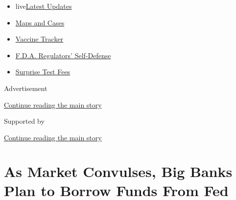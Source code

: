 \begin{itemize}
\tightlist
\item
  live\href{https://www.nytimes3xbfgragh.onion/2020/09/11/world/covid-19-coronavirus.html?name=styln-coronavirus-markets\&region=TOP_BANNER\&block=storyline_menu_recirc\&action=click\&pgtype=Article\&impression_id=3f6fb990-f4c6-11ea-8682-bfbfb46aa2bd\&variant=undefined}{Latest
  Updates}
\item
  \href{https://www.nytimes3xbfgragh.onion/interactive/2020/us/coronavirus-us-cases.html?name=styln-coronavirus-markets\&region=TOP_BANNER\&block=storyline_menu_recirc\&action=click\&pgtype=Article\&impression_id=3f6fb991-f4c6-11ea-8682-bfbfb46aa2bd\&variant=undefined}{Maps
  and Cases}
\item
  \href{https://www.nytimes3xbfgragh.onion/interactive/2020/science/coronavirus-vaccine-tracker.html?name=styln-coronavirus-markets\&region=TOP_BANNER\&block=storyline_menu_recirc\&action=click\&pgtype=Article\&impression_id=3f6fb992-f4c6-11ea-8682-bfbfb46aa2bd\&variant=undefined}{Vaccine
  Tracker}
\item
  \href{https://www.nytimes3xbfgragh.onion/2020/09/10/us/politics/fda-coronavirus-vaccine.html?name=styln-coronavirus-markets\&region=TOP_BANNER\&block=storyline_menu_recirc\&action=click\&pgtype=Article\&impression_id=3f6fb993-f4c6-11ea-8682-bfbfb46aa2bd\&variant=undefined}{F.D.A.
  Regulators' Self-Defense}
\item
  \href{https://www.nytimes3xbfgragh.onion/2020/09/09/upshot/coronavirus-surprise-test-fees.html?name=styln-coronavirus-markets\&region=TOP_BANNER\&block=storyline_menu_recirc\&action=click\&pgtype=Article\&impression_id=3f6fb994-f4c6-11ea-8682-bfbfb46aa2bd\&variant=undefined}{Surprise
  Test Fees}
\end{itemize}

Advertisement

\protect\hyperlink{after-top}{Continue reading the main story}

Supported by

\protect\hyperlink{after-sponsor}{Continue reading the main story}

\hypertarget{as-market-convulses-big-banks-plan-to-borrow-funds-from-fed}{%
\section{As Market Convulses, Big Banks Plan to Borrow Funds From
Fed}\label{as-market-convulses-big-banks-plan-to-borrow-funds-from-fed}}

